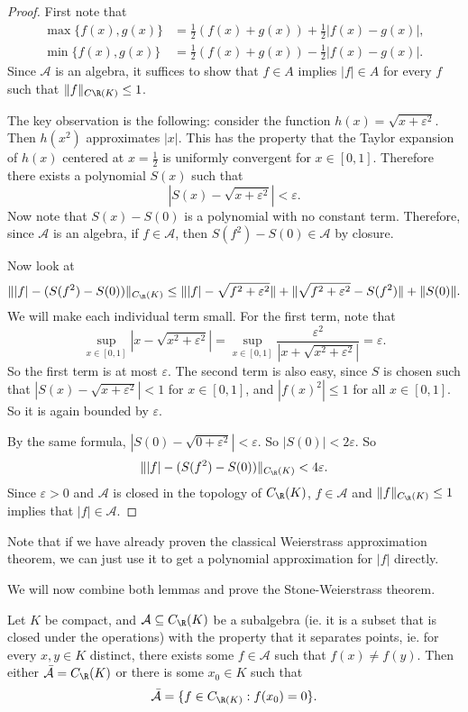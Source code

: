 \documentclass[a4paper]{article}
\begin{document}
\begin{proof}
  First note that
  \begin{align*}
    \max\{f(x), g(x)\} &= \frac{1}{2}(f(x) + g(x)) + \frac{1}{2}|f(x) - g(x)|,\\
    \min\{f(x), g(x)\} &= \frac{1}{2}(f(x) + g(x)) - \frac{1}{2}|f(x) - g(x)|.
  \end{align*}
  Since $\mathcal{A}$ is an algebra, it suffices to show that $f \in A$ implies $|f| \in A$ for every $f$ such that $\|f\|_{C\R(K)} \leq 1$.

  The key observation is the following: consider the function $h(x) = \sqrt{x + \varepsilon^2}$. Then $h(x^2)$ approximates $|x|$. This has the property that the Taylor expansion of $h(x)$ centered at $x = \frac{1}{2}$ is uniformly convergent for $x \in [0, 1]$. Therefore there exists a polynomial $S(x)$ such that
  \[
    |S(x) - \sqrt{x + \varepsilon^2}| < \varepsilon.
  \]
  Now note that $S(x) - S(0)$ is a polynomial with no constant term. Therefore, since $\mathcal{A}$ is an algebra, if $f \in \mathcal{A}$, then $S(f^2) - S(0) \in \mathcal{A}$ by closure.

  Now look at
  \[
    \||f| - (S(f^2) - S(0))\|_{C_\R(K)} \leq \||f| - \sqrt{f^2 + \varepsilon^2}\| + \|\sqrt{f^2 + \varepsilon^2} - S(f^2)\| + \|S(0)\|.
  \]
  We will make each individual term small. For the first term, note that
  \[
    \sup_{x \in [0, 1]} |x - \sqrt{x^2 + \varepsilon^2}| = \sup_{x \in [0, 1]} \frac{\varepsilon^2}{|x + \sqrt{x^2 + \varepsilon^2}|} = \varepsilon.
  \]
  So the first term is at most $\varepsilon$. The second term is also easy, since $S$ is chosen such that $|S(x) - \sqrt{x + \varepsilon^2}| < 1$ for $x \in [0, 1]$, and $|f(x)^2| \leq 1$ for all $x \in [0, 1]$. So it is again bounded by $\varepsilon$.

  By the same formula, $|S(0) - \sqrt{0 + \varepsilon^2}| < \varepsilon$. So $|S(0)| < 2\varepsilon$. So
  \[
    \||f| - (S(f^2) - S(0))\|_{C_\R(K)} < 4\varepsilon.
  \]
  Since $\varepsilon > 0$ and $\mathcal{A}$ is closed in the topology of $C_{\R}(K)$, $f\in \mathcal{A}$ and $\|f\|_{C_\R(K)} \leq 1$ implies that $|f| \in \mathcal{A}$.
\end{proof}
Note that if we have already proven the classical Weierstrass approximation theorem, we can just use it to get a polynomial approximation for $|f|$ directly.

We will now combine both lemmas and prove the Stone-Weierstrass theorem.
\begin{thm}
  Let $K$ be compact, and $\mathcal{A} \subseteq C_{\R}(K)$ be a subalgebra (ie. it is a subset that is closed under the operations) with the property that it separates points, ie. for every $x, y \in K$ distinct, there exists some $f \in \mathcal{A}$ such that $f(x) \not= f(y)$. Then either $\bar{\mathcal{A}} = C_\R(K)$ or there is some $x_0 \in K$ such that
  \[
    \bar{\mathcal{A}} = \{f \in C_{\R(K)}: f(x_0) = 0\}.
  \]
\end{thm}
\end{document}
